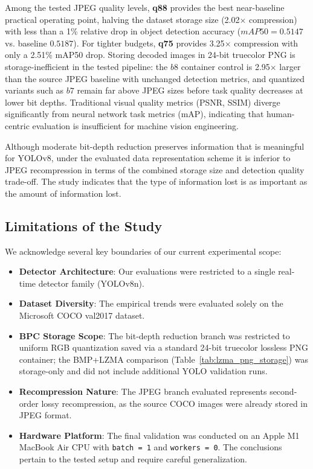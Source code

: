 \documentclass[12pt, a4paper]{article}
\begin{document}
Among the tested JPEG quality levels, \textbf{q88} provides the best near-baseline practical operating point, halving the dataset storage size (2.02$\times$ compression) with less than a 1\% relative drop in object detection accuracy ($mAP50 = 0.5147$ vs. baseline $0.5187$). For tighter budgets, \textbf{q75} provides 3.25$\times$ compression with only a 2.51\% mAP50 drop. Storing decoded images in 24-bit truecolor PNG is storage-inefficient in the tested pipeline: the $b8$ container control is 2.95$\times$ larger than the source JPEG baseline with unchanged detection metrics, and quantized variants such as $b7$ remain far above JPEG sizes before task quality decreases at lower bit depths. Traditional visual quality metrics (PSNR, SSIM) diverge significantly from neural network task metrics (mAP), indicating that human-centric evaluation is insufficient for machine vision engineering.

Although moderate bit-depth reduction preserves information that is meaningful for YOLOv8, under the evaluated data representation scheme it is inferior to JPEG recompression in terms of the combined storage size and detection quality trade-off. The study indicates that the type of information lost is as important as the amount of information lost.

\subsection{Limitations of the Study}
We acknowledge several key boundaries of our current experimental scope:
\begin{itemize}
    \item \textbf{Detector Architecture}: Our evaluations were restricted to a single real-time detector family (YOLOv8n).
    \item \textbf{Dataset Diversity}: The empirical trends were evaluated solely on the Microsoft COCO val2017 dataset.
    \item \textbf{BPC Storage Scope}: The bit-depth reduction branch was restricted to uniform RGB quantization saved via a standard 24-bit truecolor lossless PNG container; the BMP+LZMA comparison (Table~\ref{tab:lzma_png_storage}) was storage-only and did not include additional YOLO validation runs.
    \item \textbf{Recompression Nature}: The JPEG branch evaluated represents second-order lossy recompression, as the source COCO images were already stored in JPEG format.
    \item \textbf{Hardware Platform}: The final validation was conducted on an Apple M1 MacBook Air CPU with \texttt{batch = 1} and \texttt{workers = 0}. The conclusions pertain to the tested setup and require careful generalization.
\end{itemize}
\end{document}
